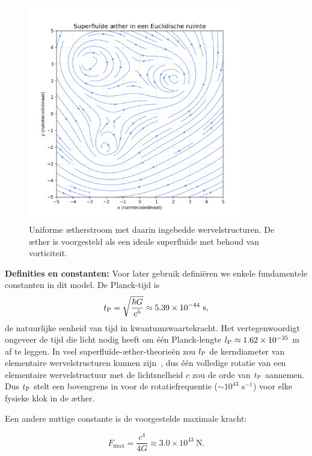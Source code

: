 \begin{figure}[htbp]
    \centering
    \includegraphics[width=0.85\textwidth]{04-ÆtherSuperfluïde_nl}
    \caption{Uniforme ætherstroom met daarin ingebedde wervelstructuren. De æther is voorgesteld als een ideale superfluïde met behoud van vorticiteit.}
    \label{fig:ÆtherSuperfluïde}
\end{figure}


\textbf{Definities en constanten:} Voor later gebruik definiëren we enkele fundamentele constanten in dit model. De Planck-tijd is
\[
    t_{\textrm P} = \sqrt{\frac{\hbar G}{c^5}} \approx 5.39\times10^{-44}\ \text{s},
\]
de natuurlijke eenheid van tijd in kwantumzwaartekracht. Het vertegenwoordigt ongeveer de tijd die licht nodig heeft om één Planck-lengte $l_{\textrm P} \approx 1.62\times10^{-35}$ m af te leggen. In veel superfluïde-æther-theorieën zou $l_{\textrm P}$ de kerndiameter van elementaire wervelstructuren kunnen zijn~\cite{Winterberg2002-PlanckÆther}, dus één volledige rotatie van een elementaire wervelstructuur met de lichtsnelheid $c$ zou de orde van $t_{\textrm P}$ aannemen. Dus $t_{\textrm P}$ stelt een bovengrens in voor de rotatiefrequentie ($\sim 10^{43}$ s$^{-1}$) voor elke fysieke klok in de æther.

Een andere nuttige constante is de voorgestelde maximale kracht:

\begin{equation*}
    F_\text{max} = \frac{c^4}{4G} \approx 3.0\times10^{43}\ \text{N}.
\end{equation*}

